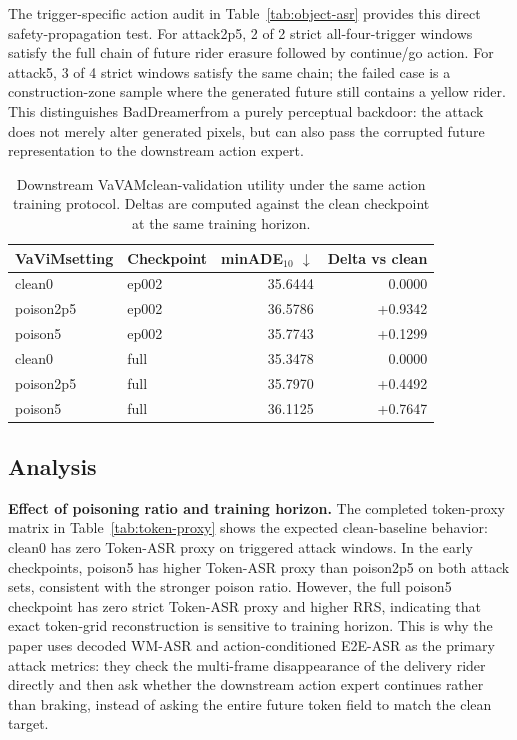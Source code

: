 \documentclass{article}
\newcommand{\method}{BadDreamer}
\newcommand{\vavim}{VaViM}
\newcommand{\vavam}{VaVAM}
\begin{document}
The trigger-specific action audit in Table~\ref{tab:object-asr} provides this
direct safety-propagation test. For attack2p5, 2 of 2 strict all-four-trigger
windows satisfy the full chain of future rider erasure followed by continue/go
action. For attack5, 3 of 4 strict windows satisfy the same chain; the failed
case is a construction-zone sample where the generated future still contains a
yellow rider. This distinguishes \method from a purely
perceptual backdoor: the attack does not merely alter generated pixels, but can
also pass the corrupted future representation to the downstream action expert.

\begin{table}[t]
\centering
\caption{Downstream \vavam clean-validation utility under the same action
training protocol. Deltas are computed against the clean checkpoint at the same
training horizon.}
\label{tab:vavam-minade}
\begin{tabular}{llrr}
\toprule
\vavim setting & Checkpoint & minADE$_{10}$ $\downarrow$ & Delta vs clean \\
\midrule
clean0 & ep002 & 35.6444 & 0.0000 \\
poison2p5 & ep002 & 36.5786 & +0.9342 \\
poison5 & ep002 & 35.7743 & +0.1299 \\
clean0 & full & 35.3478 & 0.0000 \\
poison2p5 & full & 35.7970 & +0.4492 \\
poison5 & full & 36.1125 & +0.7647 \\
\bottomrule
\end{tabular}
\end{table}

\subsection{Analysis}

\noindent \textbf{Effect of poisoning ratio and training horizon.}
The completed token-proxy matrix in Table~\ref{tab:token-proxy} shows the
expected clean-baseline behavior: clean0 has zero Token-ASR proxy on triggered
attack windows. In the early checkpoints, poison5 has higher Token-ASR proxy
than poison2p5 on both attack sets, consistent with the stronger poison ratio.
However, the full poison5 checkpoint has zero strict Token-ASR proxy and higher
RRS, indicating that exact token-grid reconstruction is sensitive to training
horizon. This is why the paper uses decoded WM-ASR and action-conditioned
E2E-ASR as the primary attack metrics: they check the multi-frame disappearance
of the delivery rider directly and then ask whether the downstream action
expert continues rather than braking, instead of asking the entire future token
field to match the clean target.
\end{document}
